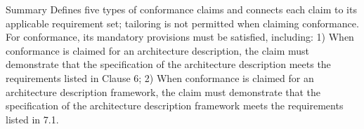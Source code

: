 \documentclass[10pt,letterpaper]{article}
\begin{document}
\begin{CornellNotesTable}
{\begin{itemize}[leftmargin=*,nosep,topsep=1pt]
\end{itemize}}
\end{CornellNotesTable}


\begin{CornellSummaryBox}{Summary}
Defines five types of conformance claims and connects each claim to its applicable requirement set; tailoring is not permitted when claiming conformance. For conformance, its mandatory provisions must be satisfied, including: 1) When conformance is claimed for an architecture description, the claim must demonstrate that the specification of the architecture description meets the requirements listed in Clause 6; 2) When conformance is claimed for an architecture description framework, the claim must demonstrate that the specification of the architecture description framework meets the requirements listed in 7.1.
\end{CornellSummaryBox}
\end{document}

